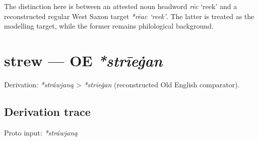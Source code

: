\documentclass[
  british,
  a4paper,
  openany]{book}
\providecommand{\Recon}[1]{\emph{*#1}}
{\catcode`→=\active \global\def→{\ensuremath{\rightarrow}}}
\providecommand{\texorpdfstring}[2]{#1}
\providecommand{\Recon}[1]{\emph{*#1}}
{\catcode`→=\active \global\def→{\ensuremath{\rightarrow}}}
\begin{document}
The distinction here is between an attested noun headword {\emph{rēc}}
`reek' and a reconstructed regular West Saxon target {\emph{\Recon{rēac}
`reek'}}. The latter is treated as the modelling target, while the
former remains philological background.

\section{\texorpdfstring{strew --- OE
\emph{*strīeġan}}{strew --- OE *strīeġan}}\label{strew-oe-strux12beux121an}


Derivation: \emph{*stráwjaną} \textgreater{} \emph{*strīeġan}
(reconstructed Old English comparator).

\subsection{Derivation trace}\label{derivation-trace-138}

Proto input: \emph{*stráwjaną}

\begingroup
\setlength{\fboxsep}{6pt}
\end{document}
